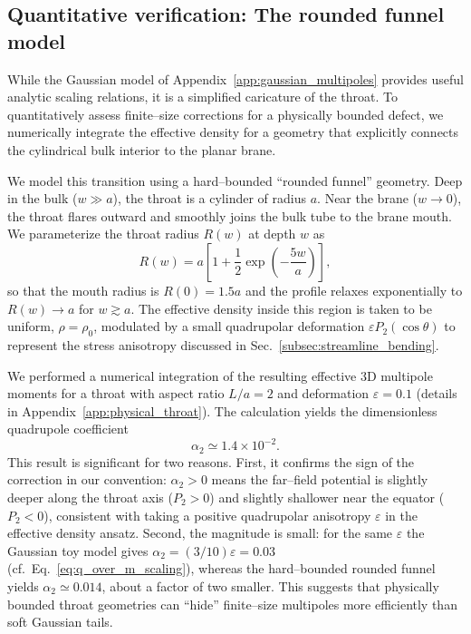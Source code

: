 \documentclass[12pt]{article}
\begin{document}
\subsection{Quantitative verification: The rounded funnel model}
\label{subsec:rounded_funnel}

While the Gaussian model of Appendix~\ref{app:gaussian_multipoles} provides useful analytic scaling relations,
it is a simplified caricature of the throat.  To quantitatively assess finite--size corrections for a physically
bounded defect, we numerically integrate the effective density for a geometry that explicitly connects the
cylindrical bulk interior to the planar brane.

We model this transition using a hard--bounded ``rounded funnel'' geometry.  Deep in the bulk ($w\gg a$),
the throat is a cylinder of radius $a$.  Near the brane ($w\to 0$), the throat flares outward and smoothly
joins the bulk tube to the brane mouth.  We parameterize the throat radius $R(w)$ at depth $w$ as
\begin{equation}
  R(w) = a\left[1+\frac{1}{2}\exp\!\left(-\frac{5w}{a}\right)\right],
  \label{eq:funnel_radius}
\end{equation}
so that the mouth radius is $R(0)=1.5a$ and the profile relaxes exponentially to $R(w)\to a$ for $w\gtrsim a$.
The effective density inside this region is taken to be uniform, $\rho=\rho_0$, modulated by a small quadrupolar
deformation $\varepsilon P_2(\cos\theta)$ to represent the stress anisotropy discussed in
Sec.~\ref{subsec:streamline_bending}.

We performed a numerical integration of the resulting effective 3D multipole moments for a throat with aspect
ratio $L/a=2$ and deformation $\varepsilon=0.1$ (details in Appendix~\ref{app:physical_throat}).  The calculation
yields the dimensionless quadrupole coefficient
\begin{equation}
  \alpha_2 \simeq 1.4\times 10^{-2}.
\end{equation}
This result is significant for two reasons.  First, it confirms the sign of the correction in our convention:
$\alpha_2>0$ means the far--field potential is slightly deeper along the throat axis ($P_2>0$) and slightly
shallower near the equator ($P_2<0$), consistent with taking a positive quadrupolar anisotropy $\varepsilon$ in the
effective density ansatz.  Second, the magnitude is small: for the same $\varepsilon$ the Gaussian toy model gives
$\alpha_2=(3/10)\varepsilon=0.03$ (cf.\ Eq.~\eqref{eq:q_over_m_scaling}), whereas the hard--bounded rounded funnel
yields $\alpha_2\simeq 0.014$, about a factor of two smaller.  This suggests that physically bounded throat
geometries can ``hide'' finite--size multipoles more efficiently than soft Gaussian tails.
\end{document}
